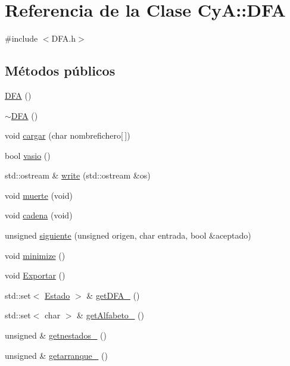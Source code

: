 \hypertarget{class_cy_a_1_1_d_f_a}{}\section{Referencia de la Clase CyA\+:\+:D\+FA}
\label{class_cy_a_1_1_d_f_a}


{\ttfamily \#include $<$D\+F\+A.\+h$>$}

\subsection*{Métodos públicos}
\begin{DoxyCompactItemize}
\item 
\mbox{\hyperlink{class_cy_a_1_1_d_f_a_aa47549d774678cc071f40176dbe4ae83}{D\+FA}} ()
\item 
\mbox{\hyperlink{class_cy_a_1_1_d_f_a_a9f224f8a08c06679a46484128e62afb1}{$\sim$\+D\+FA}} ()
\item 
void \mbox{\hyperlink{class_cy_a_1_1_d_f_a_a753f99c6d3e61fcb7035814e216002d0}{cargar}} (char nombrefichero\mbox{[}$\,$\mbox{]})
\item 
bool \mbox{\hyperlink{class_cy_a_1_1_d_f_a_ac5d949a88b7e56236e710848fdadc413}{vasio}} ()
\item 
std\+::ostream \& \mbox{\hyperlink{class_cy_a_1_1_d_f_a_a3a16e67349ab36756e3d9c7108b91e56}{write}} (std\+::ostream \&os)
\item 
void \mbox{\hyperlink{class_cy_a_1_1_d_f_a_a5b5a105e8559377533cabfdff703d0a5}{muerte}} (void)
\item 
void \mbox{\hyperlink{class_cy_a_1_1_d_f_a_afb17a8e34dc6179abb59bedc97f95dc8}{cadena}} (void)
\item 
unsigned \mbox{\hyperlink{class_cy_a_1_1_d_f_a_ad6a919f15da7b1c173ef8f40153749fc}{siguiente}} (unsigned origen, char entrada, bool \&aceptado)
\item 
void \mbox{\hyperlink{class_cy_a_1_1_d_f_a_a91c3735ac2f148c78457971a63d0a1cb}{minimize}} ()
\item 
void \mbox{\hyperlink{class_cy_a_1_1_d_f_a_aee627abe4a51a332549ae67059591967}{Exportar}} ()
\item 
std\+::set$<$ \mbox{\hyperlink{class_cy_a_1_1_estado}{Estado}} $>$ \& \mbox{\hyperlink{class_cy_a_1_1_d_f_a_ae839d9e4d46f389481eb493d6d399668}{get\+D\+F\+A\+\_\+}} ()
\item 
std\+::set$<$ char $>$ \& \mbox{\hyperlink{class_cy_a_1_1_d_f_a_a999e0a396be747ab466bf4a8c97230d2}{get\+Alfabeto\+\_\+}} ()
\item 
unsigned \& \mbox{\hyperlink{class_cy_a_1_1_d_f_a_ae5b9198e9e2676f25d1c1ff60172a494}{getnestados\+\_\+}} ()
\item 
unsigned \& \mbox{\hyperlink{class_cy_a_1_1_d_f_a_ac83c5a6a78fcbf634936888ca53051bf}{getarranque\+\_\+}} ()
\end{DoxyCompactItemize}



